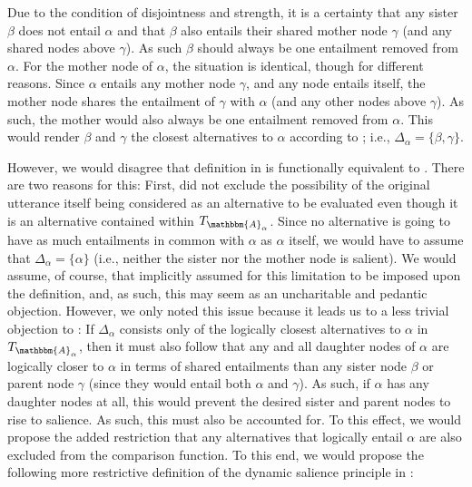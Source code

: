 \noindent Due to the condition of disjointness and strength, it is a certainty that any sister $\beta$ does not entail $\alpha$ and that $\beta$ also entails their shared mother node $\gamma$ (and any shared nodes above $\gamma$). As such $\beta$ should always be one entailment removed from $\alpha$. For the mother node of $\alpha$, the situation is identical, though for different reasons. Since $\alpha$ entails any mother node $\gamma$, and any node entails itself, the mother node shares the entailment of $\gamma$ with $\alpha$ (and any other nodes above $\gamma$). As such, the mother would also always be one entailment removed from $\alpha$. This would render $\beta$ and $\gamma$ the closest alternatives to $\alpha$ according to \textcite{Ippolito2020}; i.e., $\Delta_{\alpha}=\{\beta,\gamma\}$.

However, we would disagree that  definition in  is functionally equivalent to . There are two reasons for this: First, \textcite{Ippolito2020} did not exclude the possibility of the original utterance itself being considered as an alternative to be evaluated even though it is an alternative contained within $T_{\mathbbm{A}_\alpha}$. Since no alternative is going to have as much entailments in common with $\alpha$ as $\alpha$ itself, we would have to assume that $\Delta_\alpha=\{\alpha\}$ (i.e., neither the sister nor the mother node is salient). We would assume, of course, that \textcite{Ippolito2020} implicitly assumed for this limitation to be imposed upon the definition, and, as such, this may seem as an uncharitable and pedantic objection. However, we only noted this issue because it leads us to a less trivial objection to : If $\Delta_\alpha$ consists only of the logically closest alternatives to $\alpha$ in $T_{\mathbbm{A}_\alpha}$, then it must also follow that any and all daughter nodes of $\alpha$ are logically closer to $\alpha$ in terms of shared entailments than any sister node $\beta$ or parent node $\gamma$ (since they would entail both $\alpha$ and $\gamma$). As such, if $\alpha$ has any daughter nodes at all, this would prevent the desired sister and parent nodes to rise to salience. As such, this must also be accounted for. To this effect, we would propose the added restriction that any alternatives that logically entail $\alpha$ are also excluded from the comparison function. To this end, we would propose the following more restrictive definition of the dynamic salience principle in :
\ex{}
{}
